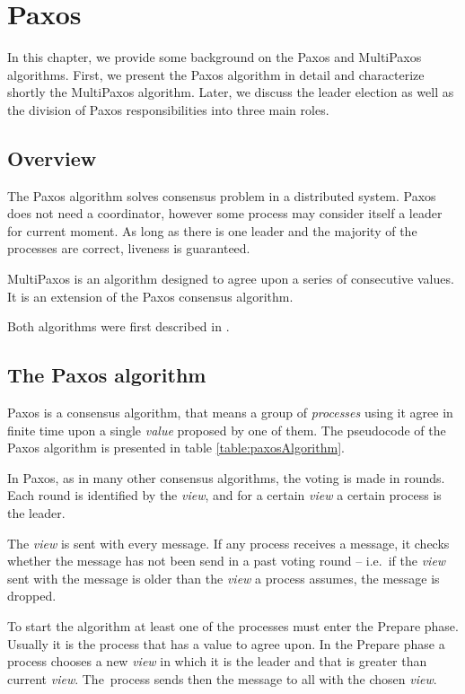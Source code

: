 \chapter{Paxos}

In this chapter, we provide some background on the Paxos and MultiPaxos algorithms.
First, we present the Paxos algorithm in detail and characterize shortly the MultiPaxos algorithm.
Later, we discuss the leader election as well as the division of Paxos responsibilities into three main roles.


\section{Overview}
The Paxos algorithm solves consensus problem in a distributed system. Paxos does not need a coordinator, however some process may consider itself a leader for current moment. As long as there is one leader and the majority of the processes are correct, liveness is guaranteed.

MultiPaxos is an algorithm designed to agree upon a series of consecutive values. \linebreak It is an extension of the Paxos consensus algorithm.

Both algorithms were first described in \cite{Lam98}.

\section{The Paxos algorithm}

Paxos is a consensus algorithm, that means a group of \textit{processes} using it agree in finite time upon a single \textit{value} proposed by one of them.
The pseudocode of the Paxos algorithm is presented in table \ref{table:paxosAlgorithm}.

In Paxos, as in many other consensus algorithms, the voting is made in rounds. Each round is identified by the \textit{view}, and for a certain \textit{view} a certain process is the leader.

The \textit{view} is sent with every message. If any process receives a message, it checks whether the message has not been send in a past voting round -- i.e.\ if the \textit{view} sent with the message is older than the \textit{view} a process assumes, the message is dropped.

To start the algorithm at least one of the processes must enter the Prepare phase. Usually it is the process that has a value to agree upon.
In the Prepare phase a process chooses a new \textit{view} in which it is the leader and that is greater than current \textit{view}. The~process sends then the \prepare message to all with the chosen \textit{view}.


